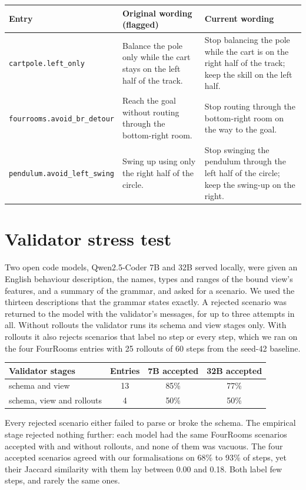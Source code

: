 \begin{center}\footnotesize\begin{tabular}{@{}l>{\raggedright\arraybackslash}p{3.9cm}>{\raggedright\arraybackslash}p{3.9cm}@{}}\toprule
Entry & Original wording (flagged) & Current wording \\ \midrule
\texttt{cartpole.left\_only} & Balance the pole only while the cart stays on the left half of the track. & Stop balancing the pole while the cart is on the right half of the track; keep the skill on the left half. \\
\texttt{fourrooms.avoid\_br\_detour} & Reach the goal without routing through the bottom-right room. & Stop routing through the bottom-right room on the way to the goal. \\
\texttt{pendulum.avoid\_left\_swing} & Swing up using only the right half of the circle. & Stop swinging the pendulum through the left half of the circle; keep the swing-up on the right. \\
\bottomrule\end{tabular}\end{center}

\section{Validator stress test}
\label{app:authoring}

Two open code models, Qwen2.5-Coder 7B and 32B served locally, were given an English behaviour description, the names, types and ranges of the bound view's features, and a summary of the grammar, and asked for a scenario. We used the thirteen descriptions that the grammar states exactly. A rejected scenario was returned to the model with the validator's messages, for up to three attempts in all. Without rollouts the validator runs its schema and view stages only. With rollouts it also rejects scenarios that label no step or every step, which we ran on the four FourRooms entries with 25 rollouts of 60 steps from the seed-42 baseline.

\begin{center}\small\begin{tabular}{@{}lccc@{}}\toprule
Validator stages & Entries & 7B accepted & 32B accepted \\ \midrule
schema and view & 13 & 85\% & 77\% \\
schema, view and rollouts & 4 & 50\% & 50\% \\
\bottomrule\end{tabular}\end{center}
Every rejected scenario either failed to parse or broke the schema. The empirical stage rejected nothing further: each model had the same FourRooms scenarios accepted with and without rollouts, and none of them was vacuous. The four accepted scenarios agreed with our formalisations on 68\% to 93\% of steps, yet their Jaccard similarity with them lay between 0.00 and 0.18. Both label few steps, and rarely the same ones.

